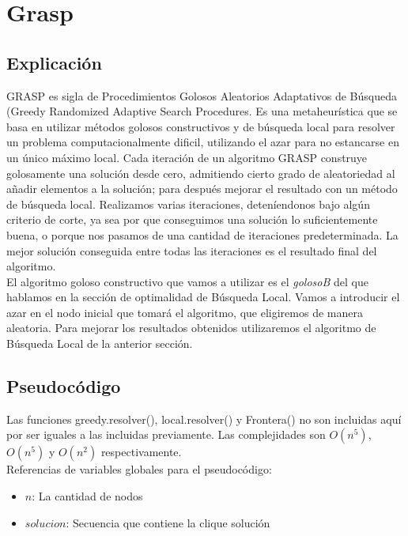 \section{Grasp}

\subsection{Explicación}
GRASP es sigla de Procedimientos Golosos Aleatorios Adaptativos de Búsqueda (Greedy Randomized Adaptive Search Procedures. Es una metaheurística que se basa en utilizar métodos golosos constructivos y de búsqueda local para resolver un problema computacionalmente dificil, utilizando el azar para no estancarse en un único máximo local. Cada iteración de un algoritmo GRASP construye golosamente una solución desde cero, admitiendo cierto grado de aleatoriedad al añadir elementos a la solución; para después mejorar el resultado con un método de búsqueda local. Realizamos varias iteraciones, deteníendonos bajo algún criterio de corte, ya sea por que conseguimos una solución lo suficientemente buena, o porque nos pasamos de una cantidad de iteraciones predeterminada. La mejor solución conseguida entre todas las iteraciones es el resultado final del algoritmo. \\

El algoritmo goloso constructivo que vamos a utilizar es el \textit{golosoB} del que hablamos en la sección de optimalidad de Búsqueda Local. Vamos a introducir el azar en el nodo inicial que tomará el algoritmo, que eligiremos de manera aleatoria. Para mejorar los resultados obtenidos utilizaremos el algoritmo de Búsqueda Local de la anterior sección.

\subsection{Pseudocódigo}

Las funciones greedy.resolver(), local.resolver() y Frontera() no son incluidas aquí por ser iguales a las incluidas previamente. Las complejidades son $O(n^5)$, $O(n^5)$ y $O(n^2)$ respectivamente. \\

Referencias de variables globales para el pseudocódigo:
\begin{itemize}
    \item $n$: La cantidad de nodos
    \item $solucion$: Secuencia que contiene la clique solución
\end{itemize}

